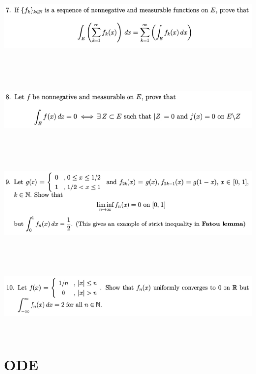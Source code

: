 \documentclass{report}
\begin{document}
\begin{question}{}{}
\includegraphics[height=4cm,width=18cm]{hw6a7}
\end{question}
\begin{question}{}{}
\includegraphics[height=4cm,width=18cm]{hw6a8}
\end{question}

\begin{question}{}{}
\includegraphics[height=5cm,width=18cm]{hw6a9}
\end{question}

\begin{question}{}{}
\includegraphics[height=4cm,width=18cm]{hw6a10}
\end{question}
\chapter{ODE}
\end{document}
